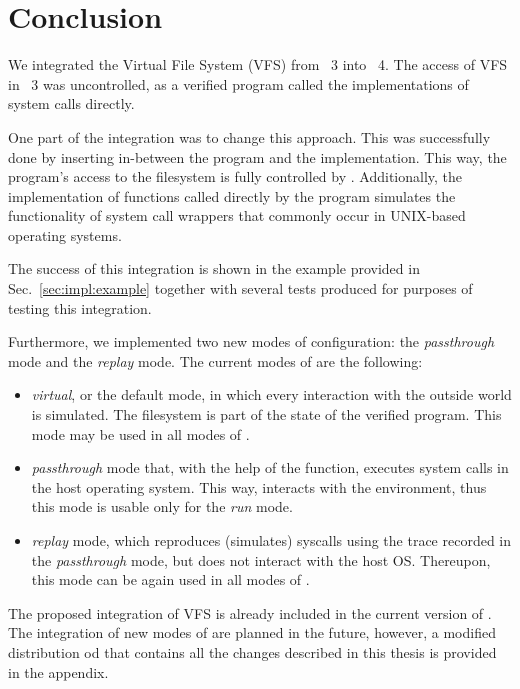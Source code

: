 \chapter{Conclusion} \label{chap:conclusion}

We integrated the Virtual File System (VFS)  from \divine~3 into \divine~4.  The access of VFS in \divine~3 was uncontrolled, as a verified program called the implementations of system calls directly.

 One part of the integration was to change this approach. This was successfully done by inserting \dios  in-between the program and the implementation. This way, the program's access to the filesystem is fully controlled by \dios. Additionally, the implementation of functions called directly by the program simulates the functionality of system call wrappers that commonly occur in UNIX-based operating systems.
 
The success of this integration is shown in the example provided in Sec.~\ref{sec:impl:example} together with several tests produced for purposes of testing this integration. 

Furthermore, we implemented two new modes of \dios configuration: the \textit{passthrough} mode and the \textit{replay} mode. The current modes of \dios are the following:

\begin{itemize}
\item \textit{virtual}, or the default mode, in which every interaction with the outside world is simulated. The filesystem is part of the state of the verified program. This mode may be used in all modes of \divine.

\item \textit{passthrough} mode that, with the help of the \vmsyscall function, executes system calls in the host operating system. This way, \divine interacts with the environment, thus this mode is usable only for the \textit{run} mode.

\item \textit{replay} mode, which reproduces (simulates) syscalls using the trace recorded in the \textit{passthrough} mode, but does not interact with the host OS. Thereupon, this mode can be again used in all modes of \divine.
\end{itemize}

The proposed integration of VFS is already included in the current version of \divine. The integration of new modes of \dios are planned in the future, however, a modified distribution od \divine that contains all the changes described in this thesis is provided in the appendix.

